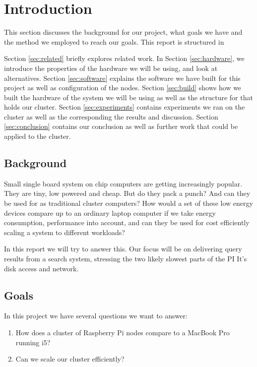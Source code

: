 \clearpage
\section{Introduction}
\label{sec:introduction}

This section discusses the background for our project, what goals we have and the method we employed to reach our goals. This report is structured in 

Section \ref{sec:related} briefly explores related work. 
In Section \ref{sec:hardware}, we introduce the properties of the hardware we will be using, and look at alternatives.
Section \ref{sec:software} explains the software we have built for this project as well as configuration of the nodes.
Section \ref{sec:build} shows how we built the hardware of the system we will be using as well as the structure for that holds our cluster.
Section \ref{sec:experiments} contains experiments we ran on the cluster as well as the corresponding the results and discussion.
Section \ref{sec:conclusion} contains our conclusion as well as further work that could be applied to the cluster.

\subsection{Background}
Small single board system on chip computers are getting increasingly popular. They are tiny, low powered and cheap. But do they pack a punch? And can they be used for as traditional cluster computers?
How would a set of these low energy devices compare up to an ordinary laptop computer if we take energy consumption, performance into account, and can they be used for cost efficiently scaling a system to different workloads?

In this report we will try to answer this. Our focus will be on delivering query results from a search system, stressing the two likely slowest parts of the PI\:
It's disk access and network.

\subsection{Goals}
In this project we have several questions we want to answer:
\begin{enumerate}
\item How does a cluster of Raspberry Pi nodes compare to a MacBook Pro running i5?
\item Can we scale our cluster efficiently?
\end{enumerate}

